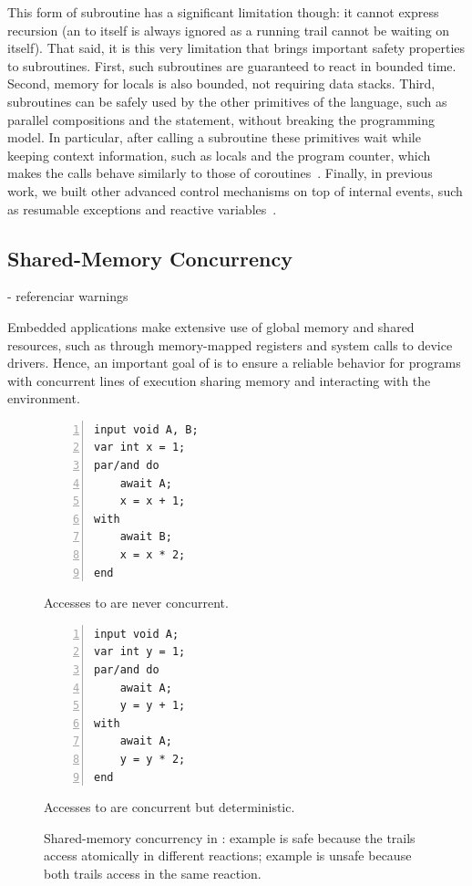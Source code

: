 This form of subroutine has a significant limitation though: it cannot
express recursion (an  to itself is always ignored as a running
trail cannot be waiting on itself).
%
That said, it is this very limitation that brings important safety
properties to subroutines.
%
First, such subroutines are guaranteed to react in bounded time.
%
Second, memory for locals is also bounded, not requiring data stacks.
%
Third, \CEU subroutines can be safely used by the other primitives of the
language, such as parallel compositions and the  statement,
without breaking the programming model.
%
In particular, after calling a subroutine these primitives wait while
keeping context information, such as locals and the program counter, which
makes the calls behave similarly to those of
coroutines~\cite{lua.coroutines}.
%
Finally, in previous work, we built other advanced control mechanisms on top
of internal events, such as resumable exceptions and reactive
variables~\cite{ceu.rem13}.
%
%

\subsection{Shared-Memory Concurrency}
    - referenciar warnings

Embedded applications make extensive use of global memory and shared resources,
such as through memory-mapped registers and system calls to device drivers.
Hence, an important goal of \CEU is to ensure a reliable behavior for programs
with concurrent lines of execution sharing memory and interacting with the
environment.

\begin{figure}[h]
\begin{minipage}[h]{0.45\linewidth}
\begin{lstlisting}[numbers=left,xleftmargin=3em]
input void A, B;
var int x = 1;
par/and do
    await A;
    x = x + 1;
with
    await B;
    x = x * 2;
end
\end{lstlisting}
\centering\small{\ax Accesses to  are never concurrent.}
\end{minipage}
%
\begin{minipage}[h]{0.45\linewidth}
\begin{lstlisting}[numbers=left,xleftmargin=3em]
input void A;
var int y = 1;
par/and do
    await A;
    y = y + 1;
with
    await A;
    y = y * 2;
end
\end{lstlisting}
\centering\small{\bx Accesses to  are concurrent but deterministic.}
\end{minipage}
\caption{ Shared-memory concurrency in \CEU:
example \ax is safe because the trails access  atomically in different
reactions;
example \bx is unsafe because both trails access  in the same reaction.
\label{lst.shared}
}
\end{figure}

